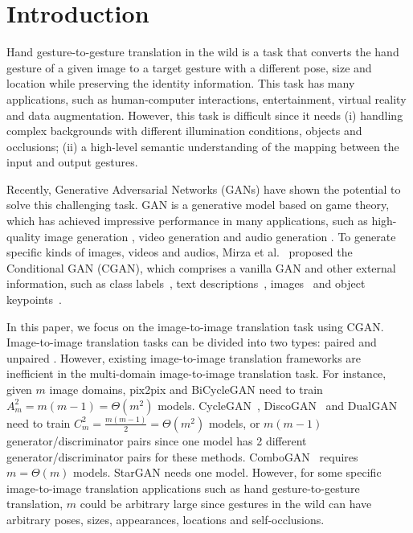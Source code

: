 \documentclass[sigconf]{acmart}
\begin{document}


\maketitle


\section{Introduction}

Hand gesture-to-gesture translation in the wild is a task that converts the hand gesture of a given image to a target gesture with a different pose, size and location while preserving the identity information.
This task has many applications, such as human-computer interactions, entertainment, virtual reality and data augmentation.
However, this task is difficult since it needs (i) handling complex backgrounds with different illumination conditions, objects and occlusions; (ii) a high-level semantic understanding of the mapping between the input and output gestures.

Recently, Generative Adversarial Networks (GANs) \cite{goodfellow2014generative} have shown the potential to solve this challenging task. GAN is a generative model based on game theory, which has achieved impressive performance in many applications, such as high-quality image generation \cite{karras2017progressive}, video generation \cite{yan2017skeleton} and audio generation \cite{oord2016wavenet}.
To generate specific kinds of images, videos and audios,  Mirza et al.~\cite{mirza2014conditional} proposed the Conditional GAN (CGAN), which comprises a vanilla GAN and other external information, such as class labels~\cite{choi2017stargan}, text descriptions~\cite{reed2016learning}, images~ \cite{isola2017image} and object keypoints~\cite{reed2016learning}.

In this paper, we focus on the image-to-image translation task using CGAN.
Image-to-image translation tasks can be divided into two types: paired \cite{isola2017image,ma2017pose,siarohin2017deformable} and unpaired \cite{zhu2017unpaired,yi2017dualgan,anoosheh2017combogan,choi2017stargan}.
However, existing image-to-image translation frameworks are inefficient in the multi-domain image-to-image translation task. 
For instance, given $m$ image domains, pix2pix \cite{isola2017image} and  BiCycleGAN \cite{zhu2017toward} need to train $A_m^2{=}m(m{-}1){=}\Theta(m^2)$ models.
CycleGAN~\cite{zhu2017unpaired}, DiscoGAN~\cite{kim2017learning} and DualGAN~\cite{yi2017dualgan} need to train $C_m^2{=}\frac{m(m{-}1)}{2}{=}\Theta(m^2)$ models, or $m(m{-}1)$ generator/discriminator pairs since one model has 2 different generator/discriminator pairs for these methods.
ComboGAN~\cite{anoosheh2017combogan} requires $m{=}\Theta(m)$ models.
StarGAN \cite{choi2017stargan} needs one model. 
However, for some specific image-to-image translation applications  such as hand gesture-to-gesture translation, $m$ could be arbitrary large since gestures in the wild can have arbitrary poses, sizes, appearances, locations and self-occlusions.
\end{document}
